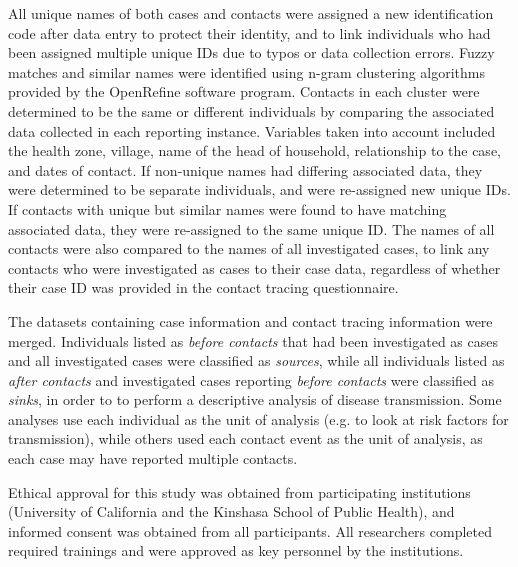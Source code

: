 All unique names of both cases and contacts were assigned a new identification code after data entry to protect their identity, and to link individuals who had been assigned multiple unique IDs due to typos or data collection errors. Fuzzy matches and similar names were identified using n-gram clustering algorithms provided by the OpenRefine software program. Contacts in each cluster were determined to be the same or different individuals by comparing the associated data collected in each reporting instance. Variables taken into account included the health zone, village, name of the head of household, relationship to the case, and dates of contact. If non-unique names had differing associated data, they were determined to be separate individuals, and were re-assigned new unique IDs. If contacts with unique but similar names were found to have matching associated data, they were re-assigned to the same unique ID. The names of all contacts were also compared to the names of all investigated cases, to link any contacts who were investigated as cases to their case data, regardless of whether their case ID was provided in the contact tracing questionnaire.

The datasets containing case information and contact tracing information were merged. Individuals listed as \textit{before contacts} that had been investigated as cases and all investigated cases were classified as \textit{sources}, while all individuals listed as \textit{after contacts} and investigated cases reporting \textit{before contacts} were classified as \textit{sinks}, in order to to perform a descriptive analysis of disease transmission. Some analyses use each individual as the unit of analysis (e.g. to look at risk factors for transmission), while others used each contact event as the unit of analysis, as each case may have reported multiple contacts. 

Ethical approval for this study was obtained from participating institutions (University of California and the Kinshasa School of Public Health), and informed consent was obtained from all participants. All researchers completed required trainings and were approved as key personnel by the institutions. 




